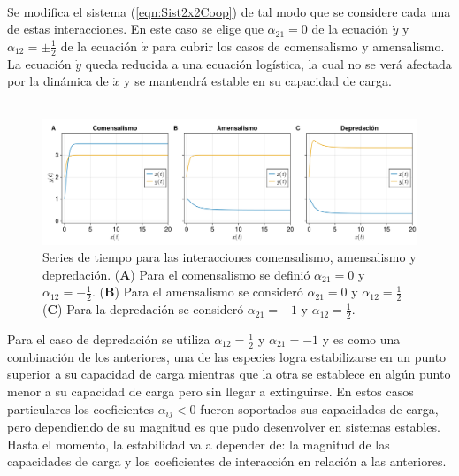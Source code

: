 \begin{ejemplo}
 	\\
 	Se modifica el sistema (\ref{eqn:Sist2x2Coop}) de tal modo que se considere cada una de estas interacciones. En este caso se elige que $\alpha_{21}=0$ de la ecuación $\dot{y}$ y $\alpha_{12}=\pm\frac{1}{2}$ de la ecuación $\dot{x}$ para cubrir los casos de comensalismo y amensalismo. La ecuación $\dot{y}$ queda reducida a una ecuación logística, la cual no se verá afectada por la dinámica de $\dot{x}$ y se mantendrá estable en su capacidad de carga. \\
 	\\
 	\begin{figure}[h!]
 		\centering
 		\includegraphics[scale=0.2]{../Imagenes/STrestoInteracciones}
 		\caption{Series de tiempo para las interacciones comensalismo, amensalismo y depredación. (\textbf{A}) Para el comensalismo se definió $\alpha_{21}=0$ y $\alpha_{12}=-\frac{1}{2}$. (\textbf{B}) Para el amensalismo se consideró $\alpha_{21}=0$ y $\alpha_{12}=\frac{1}{2}$ (\textbf{C}) Para la depredación se consideró $\alpha_{21}=-1$ y $\alpha_{12}=\frac{1}{2}$.}
 		\label{fig:RestoInteraccionesST}
 	\end{figure}
 	
	Para el caso de depredación se utiliza $\alpha_{12}=\frac{1}{2}$ y $\alpha_{21}=-1$ y es como una combinación de los anteriores, una de las especies logra estabilizarse en un punto superior a su capacidad de carga mientras que la otra se establece en algún punto menor a su capacidad de carga pero sin llegar a extinguirse. En estos casos particulares los coeficientes $\alpha_{ij}<0$ fueron soportados sus capacidades de carga, pero dependiendo de su magnitud es que pudo desenvolver en sistemas estables. Hasta el momento, la estabilidad va a depender de: la magnitud de las capacidades de carga y los coeficientes de interacción en relación a las anteriores.
\end{ejemplo}
